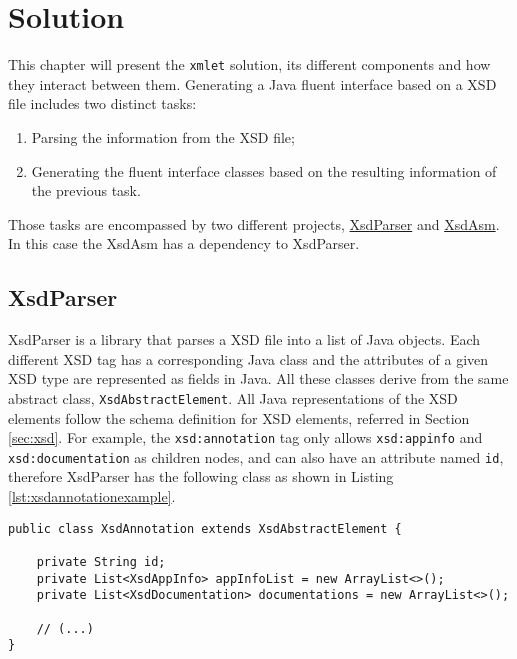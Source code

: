 \chapter{Solution}
\label{cha:solution}

\sloppy

This chapter will present the \texttt{xmlet} solution, its different components and how they interact between them. Generating a Java fluent interface based on a \ac{XSD} file includes two distinct tasks:

\begin{enumerate}
\item Parsing the information from the \ac{XSD} file;
\item Generating the fluent interface classes based on the resulting information of the previous task.
\end{enumerate}

\noindent
Those tasks are encompassed by two different projects, \hyperref[sec:xsdparser]{XsdParser} and \hyperref[sec:xsdasm]{XsdAsm}. In this case the XsdAsm has a dependency to XsdParser.

\section{XsdParser} %
\label{sec:xsdparser}

XsdParser is a library that parses a \ac{XSD} file into a list of Java objects. Each different \ac{XSD} tag has a corresponding Java class and the  attributes of a given \ac{XSD} type are represented as fields in Java. All these classes derive from the same abstract class, \texttt{XsdAbstractElement}. All Java representations of the \ac{XSD} elements follow the schema definition for \ac{XSD} elements, referred in Section \ref{sec:xsd}. For example, the \texttt{xsd:annotation} tag only allows \texttt{xsd:appinfo} and \texttt{xsd:documentation} as children nodes, and can also have an attribute named \texttt{id}, therefore XsdParser has the following class as shown in Listing \ref{lst:xsdannotationexample}.

\bigskip


\begin{minipage}{\linewidth}
\begin{lstlisting}[caption={XsdAnnotation class (Simplified)}, label={lst:xsdannotationexample}]
public class XsdAnnotation extends XsdAbstractElement {

    private String id;
    private List<XsdAppInfo> appInfoList = new ArrayList<>();
    private List<XsdDocumentation> documentations = new ArrayList<>();
    
    // (...)
}
\end{lstlisting}
\end{minipage}

